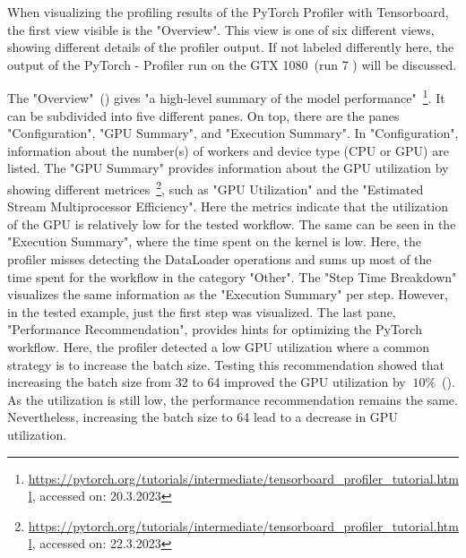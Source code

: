 \documentclass[12pt, a4paper, hidelinks]{article}
\begin{document}
When visualizing the profiling results of the PyTorch Profiler with Tensorboard, the first view visible is the "Overview". This view is one of six different views, showing different details of the profiler output. If not labeled differently here, the output of the PyTorch - Profiler run on the GTX 1080~(run 7 ) will be discussed.

The "Overview"~() gives "a high-level summary of the model performance"~\footnote{\url{https://pytorch.org/tutorials/intermediate/tensorboard_profiler_tutorial.html}, accessed on: 20.3.2023}. It can be subdivided into five different panes. On top, there are the panes "Configuration", "GPU Summary", and "Execution Summary". In "Configuration", information about the number(s) of workers and device type (\ac{CPU} or \ac{GPU}) are listed. The "GPU Summary" provides information about the GPU utilization by showing different metrices~\footnote{\url{https://pytorch.org/tutorials/intermediate/tensorboard_profiler_tutorial.html}, accessed on: 22.3.2023}, such as "GPU Utilization" and the "Estimated Stream Multiprocessor Efficiency". Here the metrics indicate that the utilization of the GPU is relatively low for the tested workflow. The same can be seen in the "Execution Summary", where the time spent on the kernel is low. Here, the profiler misses detecting the DataLoader operations and sums up most of the time spent for the workflow in the category "Other". The "Step Time Breakdown" visualizes the same information as the "Execution Summary" per step. However, in the tested example, just the first step was visualized. The last pane, "Performance Recommendation", provides hints for optimizing the PyTorch workflow. Here, the profiler detected a low \ac{GPU} utilization where a common strategy is to increase the batch size. Testing this recommendation showed that increasing the batch size from 32 to 64 improved the GPU utilization by $~10\%$~(). As the utilization is still low, the performance recommendation remains the same. Nevertheless, increasing the batch size to 64 lead to a decrease in GPU utilization.
\end{document}
